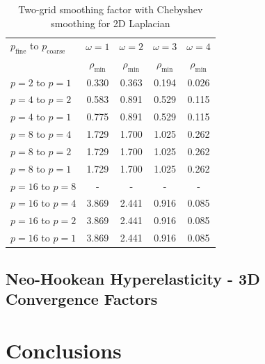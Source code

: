 \documentclass[review]{siamart190516}
\begin{document}
\begin{table}[ht!]
\begin{center}
\begin{tabular}{l c c c c}
  \toprule
  $p_{\text{fine}}$ to $p_{\text{coarse}}$  &  $\omega = 1$   &  $\omega = 2$   &  $\omega = 3$   &  $\omega = 4$   \\
                                            &  $\rho_{\min}$  &  $\rho_{\min}$  &  $\rho_{\min}$  &  $\rho_{\min}$  \\
  \midrule
  $p = 2$ to $p = 1$          &  0.330  &  0.363  &  0.194  &  0.026  \\
  $p = 4$ to $p = 2$          &  0.583  &  0.891  &  0.529  &  0.115  \\
  $p = 4$ to $p = 1$          &  0.775  &  0.891  &  0.529  &  0.115  \\
  $p = 8$ to $p = 4$          &  1.729  &  1.700  &  1.025  &  0.262  \\
  $p = 8$ to $p = 2$          &  1.729  &  1.700  &  1.025  &  0.262  \\
  $p = 8$ to $p = 1$          &  1.729  &  1.700  &  1.025  &  0.262  \\
  $p = 16$ to $p = 8$         &  -  &  -  &  -  &  -  \\
  $p = 16$ to $p = 4$         &  3.869  &  2.441  &  0.916  &  0.085  \\
  $p = 16$ to $p = 2$         &  3.869  &  2.441  &  0.916  &  0.085  \\
  $p = 16$ to $p = 1$         &  3.869  &  2.441  &  0.916  &  0.085  \\
  \bottomrule
\end{tabular}
\end{center}
\caption{Two-grid smoothing factor with Chebyshev smoothing for 2D Laplacian}
\label{table:two_grid_2d_chebyshev}
\end{table}

\subsection{Neo-Hookean Hyperelasticity - 3D Convergence Factors}\label{sec:3dresults}

\section{Conclusions}\label{sec:conclusion}
\end{document}

